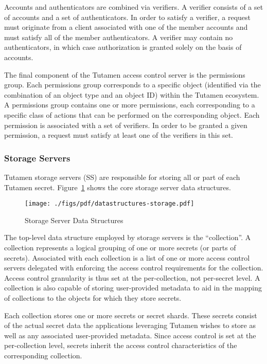 Accounts and authenticators are combined via verifiers. A verifier
consists of a set of accounts and a set of authenticators. In order to
satisfy a verifier, a request must originate from a client associated
with one of the member accounts and must satisfy all of the member
authenticators. A verifier may contain no authenticators, in which
case authorization is granted solely on the basis of accounts.

The final component of the Tutamen access control server is the
permissions group. Each permissions group corresponds to a specific
object (identified via the combination of an object type and an object
ID) within the Tutamen ecosystem. A permissions group contains one or
more permissions, each corresponding to a specific class of actions
that can be performed on the corresponding object. Each permission is
associated with a set of verifiers. In order to be granted a given
permission, a request must satisfy at least one of the verifiers in
this set.

\subsubsection{Storage Servers}
\label{sec:tutamen:arch:ss}

Tutamen storage servers (SS) are responsible for storing all or part
of each Tutamen secret. Figure~\ref{fig:tutamen:storagestructs} shows
the core storage server data structures.

\begin{figure}[th]
  \centering
  \texttt{[image: ./figs/pdf/datastructures-storage.pdf]}
  \caption{Storage Server Data Structures}
  \label{fig:tutamen:storagestructs}
\end{figure}

The top-level data structure employed by storage servers is the
``collection''. A collection represents a logical grouping of one or
more secrets (or parts of secrets). Associated with each collection is
a list of one or more access control servers delegated with enforcing
the access control requirements for the collection. Access control
granularity is thus set at the per-collection, not per-secret level. A
collection is also capable of storing user-provided metadata to aid in
the mapping of collections to the objects for which they store
secrets.

Each collection stores one or more secrets or secret shards. These
secrets consist of the actual secret data the applications leveraging
Tutamen wishes to store as well as any associated user-provided
metadata. Since access control is set at the per-collection level,
secrets inherit the access control characteristics of the
corresponding collection.


